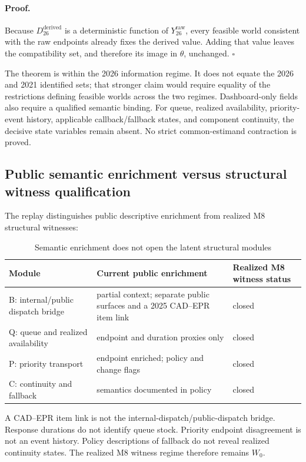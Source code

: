 \documentclass[11pt]{article}
\begin{document}
\paragraph{Proof.}
Because $D_{26}^{\mathrm{derived}}$ is a deterministic function of $Y_{26}^{\mathrm{raw}}$, every feasible world consistent with the raw endpoints already fixes the derived value. Adding that value leaves the compatibility set, and therefore its image in $\theta$, unchanged. $\square$

The theorem is within the 2026 information regime. It does not equate the 2026 and 2021 identified sets; that stronger claim would require equality of the restrictions defining feasible worlds across the two regimes. Dashboard-only fields also require a qualified semantic binding. For queue, realized availability, priority-event history, applicable callback/fallback states, and component continuity, the decisive state variables remain absent. No strict common-estimand contraction is proved.

\subsection{Public semantic enrichment versus structural witness qualification}

The replay distinguishes public descriptive enrichment from realized M8 structural witnesses:

\begin{table}[H]
\centering
\caption{Semantic enrichment does not open the latent structural modules}
\label{tab:semanticfirewall}
\begin{tabularx}{\textwidth}{@{}l X l@{}}
\toprule
Module & Current public enrichment & Realized M8 witness status \\
\midrule
B: internal/public dispatch bridge & partial context; separate public surfaces and a 2025 CAD--EPR item link & closed \\
Q: queue and realized availability & endpoint and duration proxies only & closed \\
P: priority transport & endpoint enriched; policy and change flags & closed \\
C: continuity and fallback & semantics documented in policy & closed \\
\bottomrule
\end{tabularx}
\end{table}

A CAD--EPR item link is not the internal-dispatch/public-dispatch bridge. Response durations do not identify queue stock. Priority endpoint disagreement is not an event history. Policy descriptions of fallback do not reveal realized continuity states. The realized M8 witness regime therefore remains $W_0$.
\end{document}
